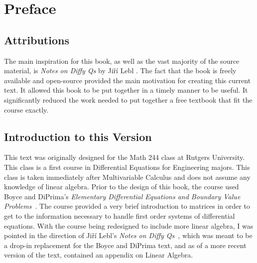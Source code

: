 \chapter*{Preface}

\section*{Attributions}

The main inspiration for this book, as well as the vast majority of the source material, is \emph{Notes on Diffy Qs} by Ji\v{r}\'{i} Lebl \cite{JL}. The fact that the book is freely available and open-source provided the main motivation for creating this current text. It allowed this book to be put together in a timely manner to be useful. It significantly reduced the work needed to put together a free textbook that fit the course exactly.

\section*{Introduction to this Version}

This text was originally designed for the Math 244 class at Rutgers University. This class is a first course in Differential Equations for Engineering majors. This class is taken immediately after Multivariable Calculus and does not assume any knowledge of linear algebra. Prior to the design of this book, the course used Boyce and DiPrima's \emph{Elementary
 Differential Equations and Boundary Value Problems}~\cite{BD}. The course provided a very brief introduction to matrices in order to get to the information necessary to handle first order systems of differential equations. With the course being redesigned to include more linear algebra, I was pointed in the direction of Ji\v{r}\'{i} Lebl's \emph{Notes on Diffy Qs}~\cite{JL}, which was meant to be a drop-in replacement for the Boyce and DiPrima text, and as of a more recent version of the text, contained an appendix on Linear Algebra. 

